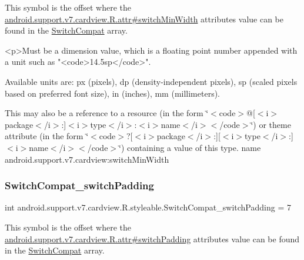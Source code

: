 This symbol is the offset where the \hyperlink{classandroid_1_1support_1_1v7_1_1cardview_1_1R_1_1attr_a708e67b59363818ee7852db665efd30d}{android.\+support.\+v7.\+cardview.\+R.\+attr\#switch\+Min\+Width} attribute\textquotesingle{}s value can be found in the \hyperlink{classandroid_1_1support_1_1v7_1_1cardview_1_1R_1_1styleable_a8b1fbe9bb91473a7977ff98951ed5255}{Switch\+Compat} array.

\begin{DoxyVerb}      <p>Must be a dimension value, which is a floating point number appended with a unit such as "<code>14.5sp</code>".
\end{DoxyVerb}
 Available units are\+: px (pixels), dp (density-\/independent pixels), sp (scaled pixels based on preferred font size), in (inches), mm (millimeters). 

This may also be a reference to a resource (in the form \char`\"{}$<$code$>$@\mbox{[}$<$i$>$package$<$/i$>$\+:\mbox{]}$<$i$>$type$<$/i$>$\+:$<$i$>$name$<$/i$>$$<$/code$>$\char`\"{}) or theme attribute (in the form \char`\"{}$<$code$>$?\mbox{[}$<$i$>$package$<$/i$>$\+:\mbox{]}\mbox{[}$<$i$>$type$<$/i$>$\+:\mbox{]}$<$i$>$name$<$/i$>$$<$/code$>$\char`\"{}) containing a value of this type.  name android.\+support.\+v7.\+cardview\+:switch\+Min\+Width \mbox{\label{classandroid_1_1support_1_1v7_1_1cardview_1_1R_1_1styleable_a282efd9317f1b44049acf1c53d892763}} 
\subsubsection{\texorpdfstring{Switch\+Compat\+\_\+switch\+Padding}{SwitchCompat\_switchPadding}}
{\footnotesize\ttfamily int android.\+support.\+v7.\+cardview.\+R.\+styleable.\+Switch\+Compat\+\_\+switch\+Padding = 7\hspace{0.3cm}{\ttfamily [static]}}

This symbol is the offset where the \hyperlink{classandroid_1_1support_1_1v7_1_1cardview_1_1R_1_1attr_a8b6e45488aae7078a0791f1fbe6229a1}{android.\+support.\+v7.\+cardview.\+R.\+attr\#switch\+Padding} attribute\textquotesingle{}s value can be found in the \hyperlink{classandroid_1_1support_1_1v7_1_1cardview_1_1R_1_1styleable_a8b1fbe9bb91473a7977ff98951ed5255}{Switch\+Compat} array.

